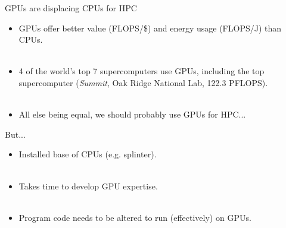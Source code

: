 \documentclass[usenames,dvipsnames]{beamer}
\begin{document}
\begin{frame}{GPUs are displacing CPUs for HPC}
  \begin{block}{}
    \begin{itemize}
      \item{GPUs offer better value (FLOPS/\$) and energy usage (FLOPS/J) than CPUs.}\\~\
      \item{4 of the world's top 7 supercomputers use GPUs, including the top supercomputer (\textit{Summit}, Oak Ridge National Lab, 122.3 PFLOPS).\footnotemark}\\~\
      \item{All else being equal, we should probably use GPUs for HPC...}
    \end{itemize}
  \end{block}
\end{frame}

\begin{frame}{But...}
  \begin{block}{}
    \begin{itemize}
      \item{Installed base of CPUs (e.g. splinter).}\\~\
      \item{Takes time to develop GPU expertise.}\\~\
      \item{Program code needs to be altered to run (effectively) on GPUs.}
    \end{itemize}
  \end{block}
\end{frame}
\end{document}
